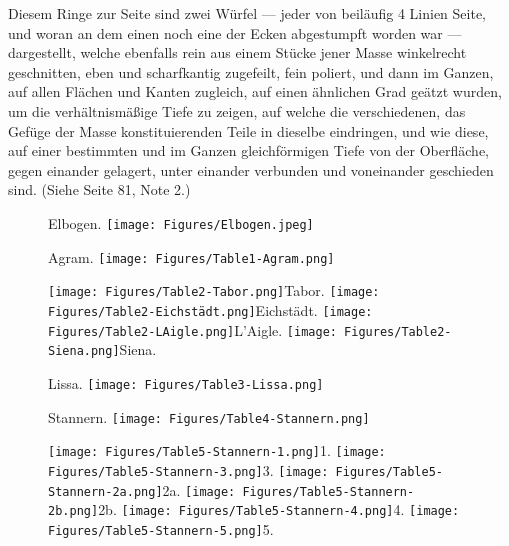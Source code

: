 \documentclass[a4paper, 11pt, oneside, german]{article}
\begin{document}
Diesem Ringe zur Seite sind zwei Würfel --- jeder von beiläufig 4 Linien Seite, und woran an dem einen noch eine der Ecken abgestumpft worden war --- dargestellt, welche ebenfalls rein aus einem Stücke jener Masse winkelrecht geschnitten, eben und scharfkantig zugefeilt, fein poliert, und dann im Ganzen, auf allen Flächen und Kanten zugleich, auf einen ähnlichen Grad geätzt wurden, um die verhältnismäßige Tiefe zu zeigen, auf welche die verschiedenen, das Gefüge der Masse konstituierenden Teile in dieselbe eindringen, und wie diese, auf einer bestimmten und im Ganzen gleichförmigen Tiefe von der Oberfläche, gegen einander gelagert, unter einander verbunden und voneinander geschieden sind. (Siehe Seite 81, Note 2.)
\clearpage
\setlength\intextsep{0pt}
\pagestyle{fancy}
\fancyhf{}
\cfoot{\thepage}
\begin{figure}[p]
\tiny Elbogen.
\texttt{[image: Figures/Elbogen.jpeg]}
\end{figure}
\clearpage
{}
\cfoot{\thepage}
\begin{figure}[p]
\tiny Agram.
\texttt{[image: Figures/Table1-Agram.png]}
\end{figure}
\clearpage
{}
\cfoot{\thepage}
\begin{figure}[p]
\texttt{[image: Figures/Table2-Tabor.png]}\tiny Tabor.
\texttt{[image: Figures/Table2-Eichstädt.png]}\tiny Eichstädt.
\texttt{[image: Figures/Table2-LAigle.png]}\tiny L'Aigle.
\texttt{[image: Figures/Table2-Siena.png]}\tiny Siena.
\end{figure}
\clearpage
{}
\cfoot{\thepage}
\begin{figure}[p]
\tiny Lissa.
\texttt{[image: Figures/Table3-Lissa.png]}
\end{figure}
\clearpage
{}
\cfoot{\thepage}
\begin{figure}[p]
\tiny Stannern.
\texttt{[image: Figures/Table4-Stannern.png]}
\end{figure}
\clearpage
{}
\cfoot{\thepage}
\begin{figure}[p]
\texttt{[image: Figures/Table5-Stannern-1.png]}\tiny 1.
\texttt{[image: Figures/Table5-Stannern-3.png]}\tiny 3.
\texttt{[image: Figures/Table5-Stannern-2a.png]}\tiny 2a.
\texttt{[image: Figures/Table5-Stannern-2b.png]}\tiny 2b.
\texttt{[image: Figures/Table5-Stannern-4.png]}\tiny 4.
\texttt{[image: Figures/Table5-Stannern-5.png]}\tiny 5.
\end{figure}
\end{document}
